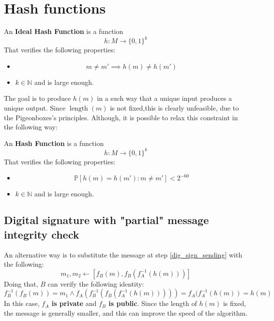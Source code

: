\section{Hash functions}
\begin{definition}
    An \textbf{Ideal Hash Function} is a function
    \[
    h: M \rightarrow \{0,1\}^{k}
    \]
    That verifies the following properties:
    \begin{itemize}
        \item \[m \neq m' \implies h(m) \neq h(m')\]
        \item $k \in \mathbb{N}$ and is large enough.
    \end{itemize}
\end{definition}

The goal is to produce $h(m)$ in a such way that a unique input produces a unique output. Since $\operatorname{length}(m)$ is not fixed,this is clearly unfeasible, due to the Pigeonboxes's principles.
Although, it is possible to relax this constraint in the following way:
\begin{definition}
    An \textbf{Hash Function} is a function
    \[
    h: M \rightarrow \{0,1\}^{k}
    \]
    That verifies the following properties:
    \begin{itemize}
        \item \[\mathbb{P}[h(m) = h(m'): m \neq m'] < 2^{-60}\]
        \item $k \in \mathbb{N}$ and is large enough.
    \end{itemize}
\end{definition}

\subsection{Digital signature with "partial" message integrity check}
An alternative way is to substitute the message at step \ref{dig_sign_sending} with the following:
\[
m_{1}, m_{2} \gets [f_{B}(m), f_{B}(f_{A}^{-1}(h(m)))]
\]
Doing that, $B$ can verify the following identity:
\[
f_{B}^{-1}(f_{B}(m)) = m_{1} \land f_{A}(f_{B}^{-1}(f_{B}(f_{A}^{-1}(h(m))))) = f_{A}(f_{A}^{-1}(h(m)) = h(m)
\]
In this case, \textbf{$f_{A}$ is private} and \textbf{$f_{B}$ is public}. \newline
Since the length of $h(m)$ is fixed, the message is generally smaller, and this can improve the speed of the algorithm.

